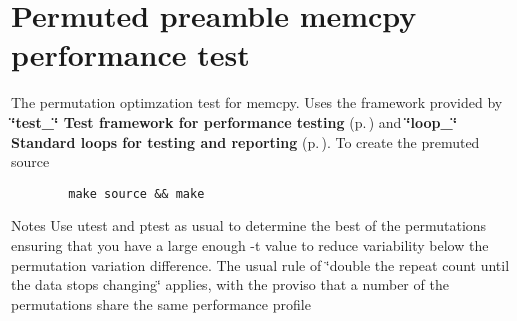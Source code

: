 \section{Permuted preamble memcpy performance test}
\label{group__permute__memcpy__test}
The permutation optimzation test for memcpy. Uses the framework provided by {\bf \char`\"{}test\_\-\char`\"{} Test framework for performance testing} {\rm (p.\,\pageref{group__test})} and {\bf \char`\"{}loop\_\-\char`\"{} Standard loops for testing and reporting} {\rm (p.\,\pageref{group__loop__test})}. 
To create the premuted source  

\footnotesize\begin{verbatim}        make source && make
\end{verbatim}\normalsize 


Notes Use utest and ptest as usual to determine the best of the permutations ensuring that you have a large enough -t value to reduce variability below the permutation variation difference. The usual rule of \char`\"{}double the repeat count until the data stops changing\char`\"{} applies, with the proviso that a number of the permutations share the same performance profile 